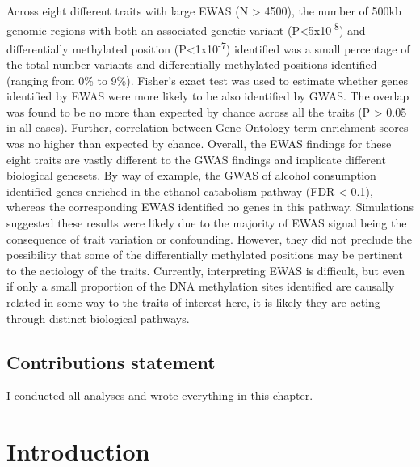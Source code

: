 \documentclass[11pt,oneside]{bristolthesis}
\begin{document}
Across eight different traits with large EWAS (N \textgreater{} 4500), the number of 500kb genomic regions with both an associated genetic variant (P\textless5x10\textsuperscript{-8}) and differentially methylated position (P\textless1x10\textsuperscript{-7}) identified was a small percentage of the total number variants and differentially methylated positions identified (ranging from 0\% to 9\%). Fisher's exact test was used to estimate whether genes identified by EWAS were more likely to be also identified by GWAS. The overlap was found to be no more than expected by chance across all the traits (P \textgreater{} 0.05 in all cases). Further, correlation between Gene Ontology term enrichment scores was no higher than expected by chance. Overall, the EWAS findings for these eight traits are vastly different to the GWAS findings and implicate different biological genesets. By way of example, the GWAS of alcohol consumption identified genes enriched in the ethanol catabolism pathway (FDR \textless{} 0.1), whereas the corresponding EWAS identified no genes in this pathway. Simulations suggested these results were likely due to the majority of EWAS signal being the consequence of trait variation or confounding. However, they did not preclude the possibility that some of the differentially methylated positions may be pertinent to the aetiology of the traits. Currently, interpreting EWAS is difficult, but even if only a small proportion of the DNA methylation sites identified are causally related in some way to the traits of interest here, it is likely they are acting through distinct biological pathways.

\hypertarget{contributions-statement-06}{%
\subsection{Contributions statement}\label{contributions-statement-06}}

I conducted all analyses and wrote everything in this chapter.

\hypertarget{introduction-06}{%
\section{Introduction}\label{introduction-06}}
\end{document}
